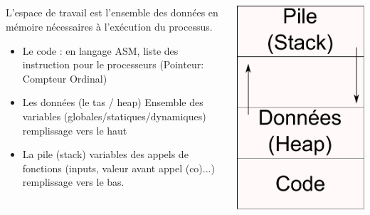 \subsection{\subsectitle}
\begin{frame}{\sectitle}
\begin{columns}[c]
\begin{block}{\subsectitle}
L'espace de travail est l'ensemble des données en mémoire nécessaires à l'exécution du processus.
\begin{itemize}
\item Le code : en langage ASM, liste des instruction pour le processeurs (Pointeur: Compteur Ordinal)
\item Les données (le tas / heap) Ensemble des variables (globales/statiques/dynamiques) remplissage vers le haut
\item La pile (stack) variables des appels de fonctions (inputs, valeur avant appel (co)...) remplissage vers le bas.
\end{itemize}
\end{block}

\includegraphics[width=\textwidth]{images/Workspace.pdf}
\end{columns}
\end{frame}

